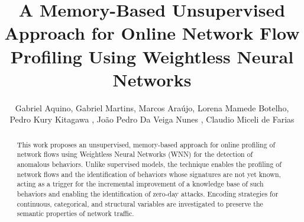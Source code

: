 \documentclass[12pt]{article}
\title{A Memory-Based Unsupervised Approach for Online Network Flow Profiling Using Weightless Neural Networks}
\author{Gabriel Aquino\inst{2}, Gabriel Martins\inst{1}, Marcos Araújo\inst{1}, Lorena Mamede Botelho\inst{1}, \\Pedro Kury Kitagawa \inst{3}, João Pedro Da Veiga Nunes \inst{3}, Claudio Miceli de Farias\inst{1}}
\begin{document}
 

\maketitle

\begin{abstract}
This work proposes an unsupervised, memory-based approach for online profiling of network flows using Weightless Neural Networks (WNN) for the detection of anomalous behaviors. Unlike supervised models, the technique enables the profiling of network flows and the identification of behaviors whose signatures are not yet known, acting as a trigger for the incremental improvement of a knowledge base of such behaviors and enabling the identification of zero-day attacks. Encoding strategies for continuous, categorical, and structural variables are investigated to preserve the semantic properties of network traffic.
\end{abstract}









\end{document}
